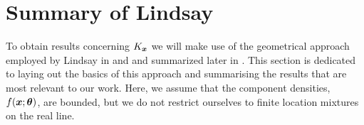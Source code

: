 	
\section{Summary of Lindsay}
\label{sec:summary of Lindsay}
	To obtain results concerning $K_{\bm{{x}}}$ we will make use of the geometrical approach employed by Lindsay in \cite{Lindsay1983-tf} and \cite{Lindsay1983a-he} and summarized later in \cite[Chapter 5]{Lindsay1995-sq}. This section is dedicated to laying out the basics of this approach and summarising the results that are most relevant to our work. Here, we assume that the component densities, $f({\bm{{x}}};{\bm{{\theta}}})$, are bounded, but we do not restrict ourselves to finite location mixtures on the real line.

